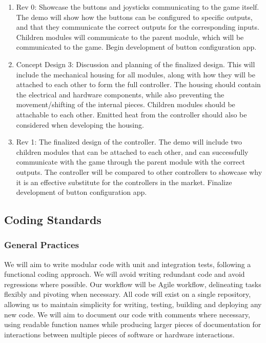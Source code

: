\documentclass[a4]{article}
\begin{document}
\begin{enumerate}
	\item \textcolor{McMasterMaroon}{Rev 0}: Showcase the buttons and joysticks communicating to the game itself. The demo will show how the buttons can be configured to specific outputs, and that they communicate the correct outputs for the corresponding inputs. Children modules will communicate to the parent module, which will be communicated to the game. Begin development of button configuration app.
	\item \textcolor{McMasterMaroon}{Concept Design 3}: Discussion and planning of the finalized design. This will include the mechanical housing for all modules, along with how they will be attached to each other to form the full controller. The housing should contain the electrical and hardware components, while also preventing the movement/shifting of the internal pieces. Children modules should be attachable to each other. Emitted heat from the controller should also be considered when developing the housing.
	\item \textcolor{McMasterMaroon}{Rev 1}: The finalized design of the controller. The demo will include two children modules that can be attached to each other, and can successfully communicate with the game through the parent module with the correct outputs. The controller will be compared to other controllers to showcase why it is an effective substitute for the controllers in the market. Finalize development of button configuration app.
\end{enumerate}


\clearpage
\subsection{Coding Standards}

\subsubsection{General Practices}

We will aim to write modular code with unit and integration tests,
following a functional coding approach.
We will avoid writing redundant code and avoid regressions where possible.
Our workflow will be Agile workflow, delineating tasks flexibly and pivoting when necessary.
All code will exist on a single repository, allowing us to maintain simplicity for writing, testing, building
and deploying any new code. We will aim to document our code with comments where necessary,
using readable function names while producing larger pieces of documentation for interactions between
multiple pieces of software or hardware interactions.
\end{document}
